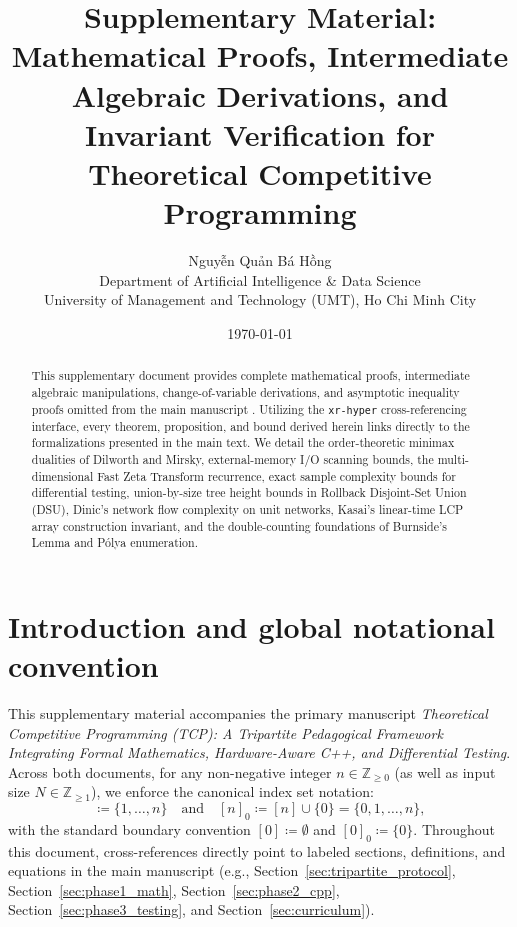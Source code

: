 \documentclass[11pt, letterpaper]{article}
\title{Supplementary Material: Mathematical Proofs, Intermediate Algebraic Derivations, and Invariant Verification for Theoretical Competitive Programming}
\author{Nguyễn Quản Bá Hồng \\
\small Department of Artificial Intelligence \& Data Science \\
\small University of Management and Technology (UMT), Ho Chi Minh City}
\date{\today}
\begin{document}
\maketitle

\begin{abstract}
This supplementary document provides complete mathematical proofs, intermediate algebraic manipulations, change-of-variable derivations, and asymptotic inequality proofs omitted from the main manuscript \cite{tao2026mathai,tao2006solving}. Utilizing the \texttt{xr-hyper} cross-referencing interface, every theorem, proposition, and bound derived herein links directly to the formalizations presented in the main text. We detail the order-theoretic minimax dualities of Dilworth and Mirsky, external-memory I/O scanning bounds, the multi-dimensional Fast Zeta Transform recurrence, exact sample complexity bounds for differential testing, union-by-size tree height bounds in Rollback Disjoint-Set Union (DSU), Dinic's network flow complexity on unit networks, Kasai's linear-time LCP array construction invariant, and the double-counting foundations of Burnside's Lemma and Pólya enumeration.
\end{abstract}

\tableofcontents
\newpage

\section{Introduction and global notational convention}
This supplementary material accompanies the primary manuscript \emph{Theoretical Competitive Programming (TCP): A Tripartite Pedagogical Framework Integrating Formal Mathematics, Hardware-Aware C++, and Differential Testing}. Across both documents, for any non-negative integer $n \in \mathbb{Z}_{\ge 0}$ (as well as input size $N \in \mathbb{Z}_{\ge 1}$), we enforce the canonical index set notation:
\begin{equation}
    [n] \coloneqq \{1, \dots, n\} \quad \text{and} \quad [n]_0 \coloneqq [n] \cup \{0\} = \{0, 1, \dots, n\},
\end{equation}
with the standard boundary convention $[0] \coloneqq \emptyset$ and $[0]_0 \coloneqq \{0\}$.
Throughout this document, cross-references directly point to labeled sections, definitions, and equations in the main manuscript (e.g., Section~\ref{sec:tripartite_protocol}, Section~\ref{sec:phase1_math}, Section~\ref{sec:phase2_cpp}, Section~\ref{sec:phase3_testing}, and Section~\ref{sec:curriculum}).
\end{document}
